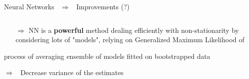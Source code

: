 \documentclass[9pt,xcolor={dvipsnames}]{beamer}
\begin{document}
\begin{frame}[fragile, t]{Neural Networks \ $\Rightarrow$ \ Improvements (?)}
\begin{columns}[T]
\end{columns}
\vspace{.3cm}
 \begin{itemize}\fontsize{8}{8}\selectfont
 	\item[$\Rightarrow$] NN is a \textbf{powerful} method dealing efficiently  with non-stationarity by considering lots of "models", relying on Generalized Maximum Likelihood of \textcolor{JungleGreen}{\citet{martins_generalized_2000}}
 \end{itemize}
\vspace{.2cm}
 	\fontsize{8}{8}\selectfont
 \begin{block}{\small {} process of averaging ensemble of models fitted on bootstrapped data}
 \end{block}
 \vspace{-.25cm}
\centering $\Rightarrow$ \ Decrease variance of the estimates

\end{frame}
\end{document}
